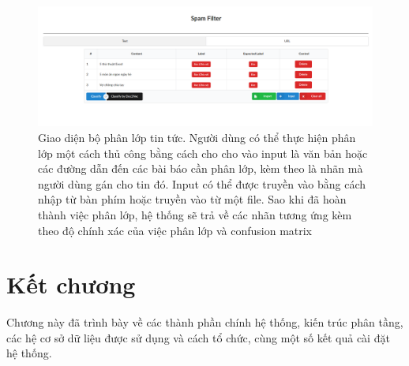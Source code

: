 \begin{figure}[H]
		\centering
	\includegraphics[width=0.96\linewidth]{Chapter3/Chapter3Figs/Filter.png}
	\caption{Giao diện bộ phân lớp tin tức. Người dùng có thể thực hiện phân lớp một cách thủ công bằng cách cho cho vào input là văn bản hoặc các đường dẫn đến các bài báo cần phân lớp, kèm theo là nhãn mà người dùng gán cho tin đó. Input có thể được truyền vào bằng cách nhập từ bàn phím hoặc truyền vào từ một file. Sao khi đã hoàn thành việc phân lớp, hệ thống sẽ trả về các nhãn tương ứng kèm theo độ chính xác của việc phân lớp và confusion matrix}
	\label{fig:startclustering}
\end{figure}

\section{Kết chương}
Chương này đã trình bày về các thành phần chính hệ thống, kiến trúc phân tầng, các hệ cơ sở dữ liệu được sử dụng và cách tổ chức, cùng một số kết quả cài đặt hệ thống.